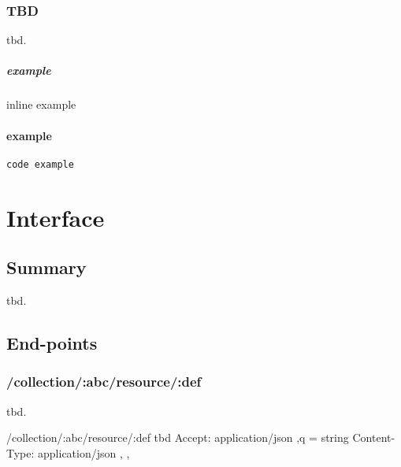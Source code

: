 \documentclass{report}
\begin{document}
\subsection{TBD}
tbd.


\paragraph{example} inline example

\subsubsection{example}
\begin{verbatim}
code example
\end{verbatim}


\chapter{Interface}

\section{Summary}
tbd.


\section{End-points}

\subsection{/collection/:abc/resource/:def}
tbd.

 {/collection/:abc/resource/:def}
   {tbd}
   {Accept: application/json \sep q = string}
   {Content-Type: application/json}
   { \sep {} \sep {}}
  
\end{document}
